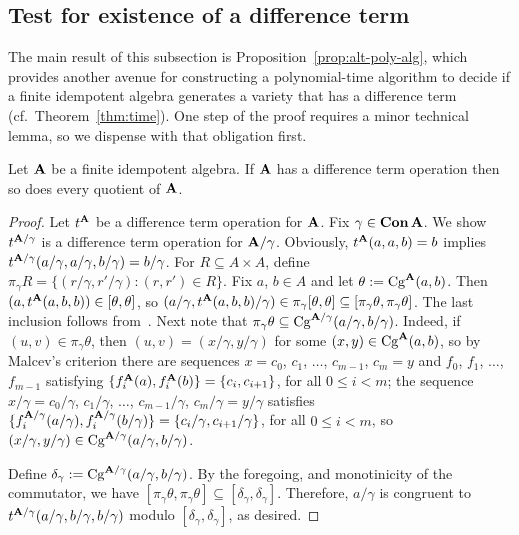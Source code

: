 \subsection{Test for existence of a difference term}
\label{sec:diffterm-test}
The main result of this subsection is Proposition~\ref{prop:alt-poly-alg}, which provides another avenue for constructing a polynomial-time algorithm to decide if a finite idempotent algebra generates a variety that has a difference term (cf.~Theorem~\ref{thm:time}).
One step of the proof requires a minor technical lemma, so we dispense with that obligation first.
\begin{lemma} \label{lem:dt-quotients}
  Let $\mathbf{A}$ be a finite idempotent algebra.
  If $\mathbf{A}$ has a difference term operation then so does every quotient of $\mathbf{A}$.
\end{lemma}
\begin{proof}
Let $t^{\mathbf{A}}$ be a difference term operation for $\mathbf{A}$.  Fix $\gamma \in \operatorname{\mathbf{Con}} \mathbf{A}$.
We show $t^{\mathbf{A}/\gamma}$ is a difference term operation for $\mathbf{A}/\gamma$.
Obviously, $t^{\mathbf{A}}(a,a,b) = b$  implies
$t^{\mathbf{A}/\gamma}(a/\gamma, a/\gamma, b/\gamma) = b/\gamma$.
For $R \subseteq A\times A$, define $\pi_\gamma R = \{(r/\gamma, r'/\gamma) : (r, r') \in R\}$.
Fix $a$, $b \in A$ and let $\theta:= \operatorname{Cg}^{\mathbf{A}}(a,b)$.
Then $(a, t^{\mathbf{A}}(a,b,b)) \in [\theta, \theta]$, so
$(a/\gamma, t^{\mathbf{A}}(a,b,b)/\gamma) \in \pi_\gamma [\theta, \theta] \subseteq [\pi_\gamma \theta, \pi_\gamma \theta]$.
The last inclusion follows from~\cite[Theorem 2.10]{MR1358491}.  Next note that
$\pi_\gamma \theta \subseteq \operatorname{Cg}^{\mathbf{A}/\gamma}(a/\gamma, b/\gamma)$. Indeed,
if $(u,v) \in \pi_\gamma \theta$, then $(u,v)  = (x/\gamma, y/\gamma)$ for some
$(x,y) \in \operatorname{Cg}^{\mathbf{A}}(a,b)$, so by Malcev's criterion there are sequences
$x = c_0$, $c_1$, $\dots$, $c_{m-1}$, $c_{m} = y$ and $f_0$, $f_1$, $\dots$, $f_{m-1}$ satisfying
$\{f^{\mathbf{A}}_i(a), f^{\mathbf{A}}_i(b)\} = \{c_i, c_{i+1}\}$, for all $0\leq i< m$;
the sequence
$x/\gamma = c_0/\gamma$, $c_1/\gamma$, $\dots$, $c_{m-1}/\gamma$, $c_{m}/\gamma = y/\gamma$
satisfies
$\{f^{\mathbf{A}/\gamma}_i(a/\gamma), f^{\mathbf{A}/\gamma}_i(b/\gamma)\} = \{c_i/\gamma, c_{i+1}/\gamma\}$,
for all $0\leq i< m$, so $(x/\gamma, y/\gamma) \in \operatorname{Cg}^{\mathbf{A}/\gamma}(a/\gamma, b/\gamma)$.

Define $\delta_\gamma := \operatorname{Cg}^{\mathbf{A}/\gamma}(a/\gamma, b/\gamma)$.
By the foregoing, and monotinicity of the commutator, we have
$[\pi_\gamma \theta, \pi_\gamma \theta] \subseteq [\delta_\gamma, \delta_\gamma]$.
Therefore, $a/\gamma$ is congruent to $t^{\mathbf{A}/\gamma}(a/\gamma,b/\gamma,b/\gamma)$ modulo
$[\delta_\gamma, \delta_\gamma]$, as desired.
\end{proof}


